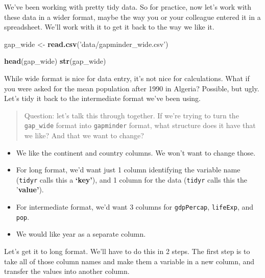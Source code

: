 \documentclass[]{book}
\newenvironment{Shaded}{\begin{snugshade}}{\end{snugshade}}
\newcommand{\KeywordTok}[1]{\textcolor[rgb]{0.13,0.29,0.53}{\textbf{{#1}}}}
\newcommand{\StringTok}[1]{\textcolor[rgb]{0.31,0.60,0.02}{{#1}}}
\newcommand{\NormalTok}[1]{{#1}}
\providecommand{\tightlist}{%
  \setlength{\itemsep}{0pt}\setlength{\parskip}{0pt}}
\theoremstyle{definition}
\theoremstyle{definition}
\theoremstyle{definition}
\theoremstyle{remark}
\begin{document}
We've been working with pretty tidy data. So for practice, now let's
work with these data in a wider format, maybe the way you or your
colleague entered it in a spreadsheet. We'll work with it to get it back
to the way we like it.

\begin{Shaded}
\begin{Highlighting}[]
\NormalTok{gap_wide <-}\StringTok{ }\KeywordTok{read.csv}\NormalTok{(}\StringTok{'data/gapminder_wide.csv'}\NormalTok{)}
\end{Highlighting}
\end{Shaded}

\begin{Shaded}
\begin{Highlighting}[]
\KeywordTok{head}\NormalTok{(gap_wide)}
\KeywordTok{str}\NormalTok{(gap_wide)}
\end{Highlighting}
\end{Shaded}

While wide format is nice for data entry, it's not nice for
calculations. What if you were asked for the mean population after 1990
in Algeria? Possible, but ugly. Let's tidy it back to the intermediate
format we've been using.

\begin{quote}
Question: let's talk this through together. If we're trying to turn the
\texttt{gap\_wide} format into \texttt{gapminder} format, what structure
does it have that we like? And that we want to change?
\end{quote}

\begin{itemize}
\tightlist
\item
  We like the continent and country columns. We won't want to change
  those.
\item
  For long format, we'd want just 1 column identifying the variable name
  (\texttt{tidyr} calls this a \textbf{`key'}), and 1 column for the
  data (\texttt{tidyr} calls this the '\textbf{value'}).
\item
  For intermediate format, we'd want 3 columns for \texttt{gdpPercap},
  \texttt{lifeExp}, and \texttt{pop}.
\item
  We would like year as a separate column.
\end{itemize}

Let's get it to long format. We'll have to do this in 2 steps. The first
step is to take all of those column names and make them a variable in a
new column, and transfer the values into another column.
\end{document}
